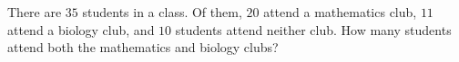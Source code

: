 There are $35$ students in a class. Of them, $20$ attend a mathematics club, $11$ attend a biology club, and $10$ students attend neither club. How many students attend both the mathematics and biology clubs?
